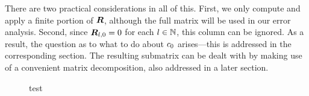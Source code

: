 There are two practical considerations in all of this. First, we only
compute and apply a finite portion of $\boldsymbol{R}$, although the full
matrix will be used in our error analysis. Second, since
$\boldsymbol{R}_{l,0} = 0$ for each $l\in\mathbb{N}$, this column can be ignored. As a
result, the question as to what to do about ${c}_{0}$
arises---this is addressed in the corresponding section. The resulting
submatrix can be dealt with by making use of a convenient matrix
decomposition, also addressed in a later section.

\begin{figure}[h]
  \centering
  
  \caption{test}\label{fig:errorbound}
\end{figure}


